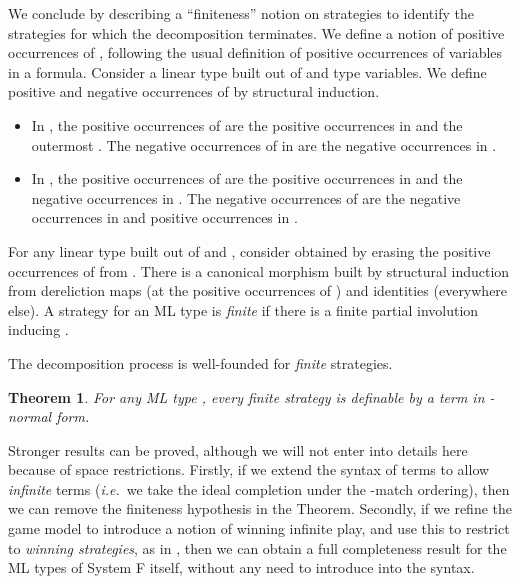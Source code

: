 \documentclass[a4paper,11pt]{article}
\newtheorem{theorem}[proposition]{Theorem}
\newcommand{\ie}{\textit{i.e.}\ }
\begin{document}
We conclude by describing a ``finiteness'' notion on strategies to
identify the strategies for which the decomposition terminates. We
define a notion of positive occurrences of , following the
usual definition of positive occurrences of variables in a
formula. Consider a linear type built out of  and
type variables.  We define positive and negative occurrences of
 by structural induction.
\begin{itemize}
\item In , the positive occurrences of  are the positive
occurrences in
 and the outermost .  The negative occurrences of  in
 are the negative occurrences in .
\item In , the positive occurrences of  are the
positive occurrences in  and the negative occurrences in .
The negative occurrences of  are the negative occurrences in
 and positive occurrences in .
\end{itemize}
For any linear type  built out of  and , consider  obtained by erasing the positive occurrences
of  from .  There is a canonical morphism 
built by structural induction from dereliction maps (at the positive
occurrences of ) and identities (everywhere else). A strategy
 for an ML type  is \emph{finite} if
there is a finite partial involution  inducing
.

The decomposition process is well-founded for \emph{finite}
strategies.
\begin{theorem}
For any ML type , every finite strategy 
is definable by a  term in -normal form.
\end{theorem}

Stronger results can be proved, although we will not enter into details
here because of space restrictions. Firstly, if we extend the syntax of
 terms to allow \emph{infinite} terms (\ie we take the
ideal completion under the -match ordering), then we can
remove the finiteness hypothesis in the Theorem.
Secondly, if we refine the game model to introduce a notion of
winning infinite play, and use this to restrict to \emph{winning
strategies}, as in \cite{Abr96}, then we can obtain a full completeness
result for the ML types of System F itself, without any need to introduce 
into the syntax.
 
\end{document}
